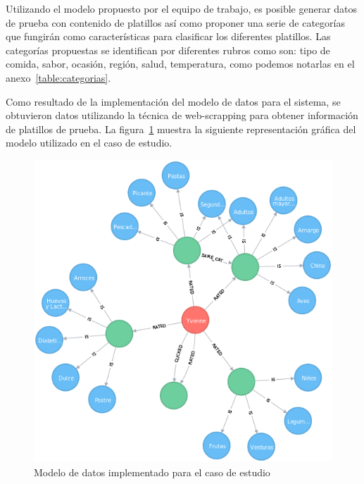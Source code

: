     Utilizando el modelo propuesto por el equipo de trabajo, es posible generar datos de prueba con contenido de platillos así como proponer una serie de categorías que fungirán como características para clasificar los diferentes platillos. Las categorías propuestas se identifican por diferentes rubros como son: tipo de comida, sabor, ocasión, región, salud, temperatura, como podemos notarlas en el anexo~\ref{table:categorias}.\cite{23,24}

    Como resultado de la implementación del modelo de datos para el sistema, se obtuvieron datos utilizando la técnica de web-scrapping para obtener información de platillos de prueba. La figura~\ref{fig:neo4j graph} muestra la siguiente representación gráfica del modelo utilizado en el caso de estudio. 
          \begin{figure}[h!]
            \centering
            \includegraphics[width=12cm]{./images/graph}
            \caption{Modelo de datos implementado para el caso de estudio}
            \label{fig:neo4j graph}
          \end{figure}
